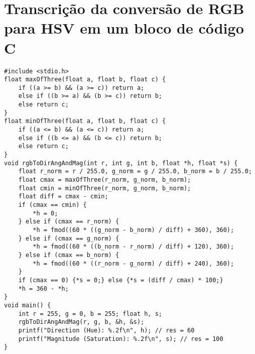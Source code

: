 

\chapter{Transcrição da conversão de RGB para HSV em um bloco de código C \label{anx_rgb_to_hsv}}

\lstset{language=C}
\begin{lstlisting}
#include <stdio.h>
float maxOfThree(float a, float b, float c) {
	if ((a >= b) && (a >= c)) return a;
	else if ((b >= a) && (b >= c)) return b;
	else return c;
}
float minOfThree(float a, float b, float c) {
	if ((a <= b) && (a <= c)) return a;
	else if ((b <= a) && (b <= c)) return b;
	else return c;
}
void rgbToDirAngAndMag(int r, int g, int b, float *h, float *s) {
	float r_norm = r / 255.0, g_norm = g / 255.0, b_norm = b / 255.0;
	float cmax = maxOfThree(r_norm, g_norm, b_norm);
	float cmin = minOfThree(r_norm, g_norm, b_norm);
	float diff = cmax - cmin;
	if (cmax == cmin) {
		*h = 0;
	} else if (cmax == r_norm) {
		*h = fmod((60 * ((g_norm - b_norm) / diff) + 360), 360);
	} else if (cmax == g_norm) {
		*h = fmod((60 * ((b_norm - r_norm) / diff) + 120), 360);
	} else if (cmax == b_norm) {
		*h = fmod((60 * ((r_norm - g_norm) / diff) + 240), 360);
	}
	if (cmax == 0) {*s = 0;} else {*s = (diff / cmax) * 100;}
	*h = 360 - *h;
}
void main() {
	int r = 255, g = 0, b = 255; float h, s;
	rgbToDirAngAndMag(r, g, b, &h, &s);
	printf("Direction (Hue): %.2f\n", h); // res = 60
	printf("Magnitude (Saturation): %.2f\n", s); // res = 100
}
	
\end{lstlisting}